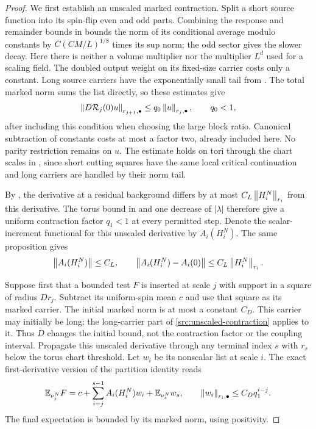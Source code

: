 \begin{proof}
We first establish an unscaled marked contraction. Split a short source
function into its spin-flip even and odd parts. Combining the response
and remainder bounds in  bounds the norm of its
conditional average modulo constants by $C(CM/L)^{1/8}$ times its
sup norm; the odd sector gives the slower decay. Here there is neither
a volume multiplier nor the multiplier $L^d$ used for a scaling field.
The doubled output
weight on its fixed-size carrier costs only a constant. Long source
carriers have the exponentially small tail from .
The total marked norm sums the list directly, so these estimates give
\begin{equation}
 \left\|D\mathcal R_j(0)u\right\|_{r_{j+1},\bullet}
 \leq q_0\left\|u\right\|_{r_j,\bullet},
 \qquad q_0<1,
 \label{src:unscaled-contraction}
\end{equation}
after including this condition when choosing the large block ratio.
Canonical subtraction of constants costs at most a factor two, already
included here. No parity restriction remains on $u$. The estimate
holds on tori through the chart scales in , since
short cutting squares have the same local critical continuation and
long carriers are handled by their norm tail.

By , the derivative at a residual background differs by
at most $C_L\left\|H_i^N\right\|_{r_i}$ from this derivative. The torus bound
in  and one decrease of $|\lambda|$ therefore give
a uniform contraction factor $q_1<1$ at every permitted step. Denote
the scalar-increment functional for this unscaled derivative by
$A_i(H_i^N)$. The same proposition gives
\begin{equation}
 \left\|A_i(H_i^N)\right\|\leq C_L,
 \qquad
 \left\|A_i(H_i^N)-A_i(0)\right\|
    \leq C_L\left\|H_i^N\right\|_{r_i}.
 \label{src:unscaled-scalars}
\end{equation}

Suppose first that a bounded test $F$ is inserted at scale $j$ with
support in a square of radius $D r_j$. Subtract its uniform-spin mean
$c$ and use that square as its marked carrier. The initial marked norm
is at most a constant $C_D$. This carrier may initially be long; the
long-carrier part of \eqref{src:unscaled-contraction} applies to it.
Thus $D$ changes the initial bound, not the contraction factor or the
coupling interval. Propagate this unscaled derivative through
any terminal index $s$ with $r_s$ below the torus chart threshold.
Let $w_i$ be its nonscalar list at scale $i$. The exact first-derivative
version of the partition identity reads
\begin{equation}
 {\mathbb E}_{\nu_j^N}F
 =c+\sum_{i=j}^{s-1} A_i(H_i^N)w_i
      +{\mathbb E}_{\nu_s^N}w_s,
 \qquad
 \left\|w_i\right\|_{r_i,\bullet}\leq C_D q_1^{i-j}.
 \label{src:local-telescope}
\end{equation}
The final expectation is bounded by its marked norm, using positivity.


\end{proof}
